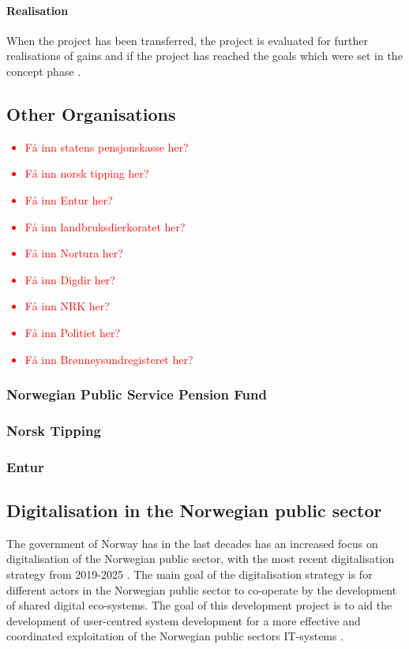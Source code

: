 \paragraph{Realisation}
When the project has been transferred, the project is evaluated for further realisations of gains and if the project has reached the goals which were set in the concept phase \cite{project_wizard_digdir_2023}.

\subsection{Other Organisations}
\textcolor{red}{
\begin{itemize}
    \item Få inn statens pensjonskasse her?
    \item Få inn norsk tipping her?
    \item Få inn Entur her?
    \item Få inn landbruksdierkoratet her?
    \item Få inn Nortura her?
    \item Få inn Digdir her?
    \item Få inn NRK her?
    \item Få inn Politiet her?
    \item Få inn Brønneysundregisteret her?
\end{itemize}
}

\subsubsection{Norwegian Public Service Pension Fund}

\subsubsection{Norsk Tipping}

\subsubsection{Entur}

\subsection{Digitalisation in the Norwegian public sector}
The government of Norway has in the last decades has an increased focus on digitalisation of the Norwegian public sector, with the most recent digitalisation strategy from 2019-2025 \cite{r_2019}. The main goal of the digitalisation strategy is for different actors in the Norwegian public sector to co-operate by the development of shared digital eco-systems. The goal of this development project is to aid the development of user-centred system development for a more effective and coordinated exploitation of the Norwegian public sectors IT-systems \cite{r_2019}.

